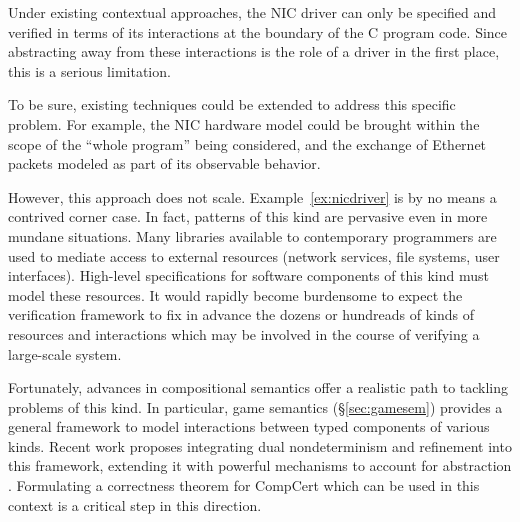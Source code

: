 \documentclass[sigplan,10pt,review]{acmart}
\begin{document}
Under existing contextual approaches,
the NIC driver can only be specified and verified in terms of
its interactions at the boundary of the C program code.
Since abstracting away from these interactions
is the role of a driver in the first place,
this is a serious limitation.

To be sure,
existing techniques could be extended
to address this specific problem.
For example,
the NIC hardware model could be brought
within the scope of the ``whole program'' being considered,
and the exchange of Ethernet packets
modeled as part of its observable behavior.

However, this approach does not scale.
Example~\ref{ex:nicdriver}
is by no means a contrived corner case.
In fact, patterns of this kind are pervasive even in more mundane situations.
Many libraries available to contemporary programmers
are used to mediate access to external resources
(network services, file systems, user interfaces).
High-level specifications
for software components of this kind
must model these resources.
It would rapidly become burdensome to expect
the verification framework
to fix in advance
the dozens or hundreads
of kinds of resources and interactions
which may be involved
in the course of verifying a large-scale system.

Fortunately,
advances in compositional semantics
offer a realistic path
to tackling problems of this kind.
In particular,
game semantics (\S\ref{sec:gamesem})
provides a general framework
to model interactions between typed components
of various kinds.
Recent work proposes integrating
dual nondeterminism and refinement
into this framework,
extending it with powerful mechanisms
to account for abstraction \cite{rbgs-cal}.
Formulating
a correctness theorem for CompCert
which can be used in this context
is a critical step in this direction.

\end{document}
